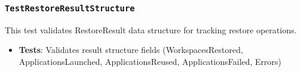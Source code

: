 \subsubsection*{\texttt{TestRestoreResultStructure}}
This test validates RestoreResult data structure for tracking restore operations.
\begin{itemize}
    \item \textbf{Tests}: Validates result structure fields (WorkspacesRestored, ApplicationsLaunched, ApplicationsReused, ApplicationsFailed, Errors)
\end{itemize}
